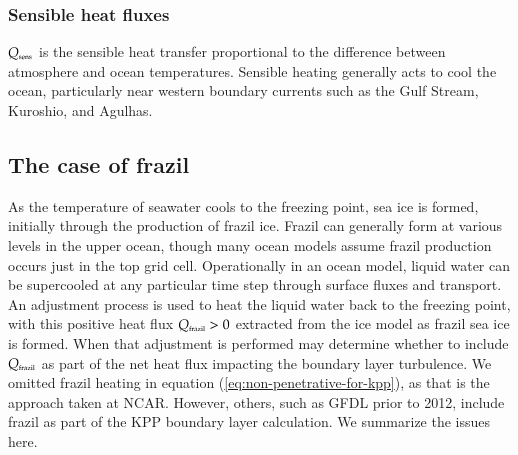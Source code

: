 \subsubsection{Sensible heat fluxes}

$Q_{\mbox{\tiny sens}}$ is the sensible heat transfer proportional to
the difference between atmosphere and ocean temperatures. Sensible
heating generally acts to cool the ocean, particularly near western
boundary currents such as the Gulf Stream, Kuroshio, and Agulhas.


\subsection{The case of frazil}
\label{subsection:frazil-and-kpp}

As the temperature of seawater cools to the freezing point, sea ice is
formed, initially through the production of frazil ice.  Frazil can
generally form at various levels in the upper ocean, though many ocean
models assume frazil production occurs just in the top grid cell.
Operationally in an ocean model, liquid water can be supercooled at
any particular time step through surface fluxes and transport.  An
adjustment process is used to heat the liquid water back to the
freezing point, with this positive heat flux $Q_{\mbox{\tiny frazil}}
> 0$ extracted from the ice model as frazil sea ice is formed.  When
that adjustment is performed may determine whether to include
$Q_{\mbox{\tiny frazil}}$ as part of the net heat flux impacting the
boundary layer turbulence.  We omitted frazil heating in equation
(\ref{eq:non-penetrative-for-kpp}), as that is the approach taken at
NCAR. However, others, such as GFDL prior to 2012, include frazil as
part of the KPP boundary layer calculation.  We summarize the issues
here.


